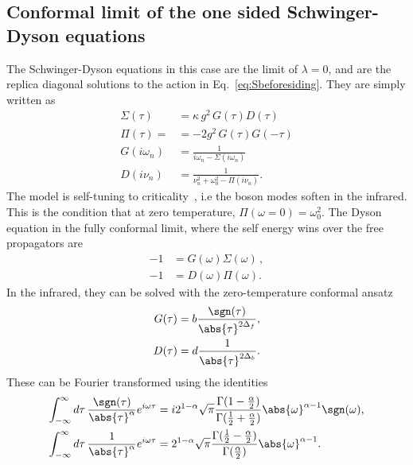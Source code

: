 \subsection{Conformal limit of the one sided Schwinger-Dyson equations}
\label{app:confoneside}
The Schwinger-Dyson equations in this case are the limit of $\lambda = 0$, and are the replica diagonal solutions to the action in Eq.~\eqref{eq:Sbeforesiding}. They are simply written as
\begin{subequations}
\begin{align}
    \Sigma(\tau) &= \kappa \, g^2 \, G(\tau) D(\tau) \\
    \Pi(\tau) = &= -2g^2 \, G(\tau)G(-\tau) \\
    G(i\omega_n) &= \frac{1}{i\omega_n - \Sigma(i\omega_n)} \\
    D(i\nu_n) &= \frac{1}{\nu_n^2 + \omega_0^2 - \Pi(i\nu_n)} .
    \label{eq:SchDysEqnsSingleYSYK_Imag}
\end{align}
\end{subequations}
The model is self-tuning to criticality~\cite{esterlis2019cooper}, i.e the boson modes soften in the infrared. This is the condition that at zero temperature, $\Pi(\omega = 0) = \omega_0^2$.
The Dyson equation in the fully conformal limit, where the self energy wins over the free propagators are 
\begin{subequations}
\begin{align}
     -1 &= G(\omega)\Sigma(\omega) \,, \\
     -1 &= D(\omega)\Pi(\omega).
\end{align}
    \label{eq:DysonFreq}
\end{subequations}
In the infrared, they can be solved with the zero-temperature conformal ansatz 
\begin{align}
    G(\tau) &= b\frac{\sgn(\tau)}{\abs{\tau}^{2\Delta_f}} ,\\
    D(\tau) &= d\frac{1}{\abs{\tau}^{2\Delta_b}} .
\end{align}
These can be Fourier transformed using the identities
\begin{align}
        \int_{-\infty}^{\infty} d\tau\,\frac{\sgn(\tau)}{\abs{\tau}^\alpha} e^{i\omega\tau} &= i2^{1-\alpha}\sqrt{\pi}\frac{\Gamma(1-\frac{\alpha}{2})}{\Gamma(\frac{1}{2}+\frac{\alpha}{2})}\abs{\omega}^{\alpha-1}\sgn(\omega) , \\
        \int_{-\infty}^{\infty} d\tau\,\frac{1}{\abs{\tau}^\alpha} e^{i\omega\tau}  &= 2^{1-\alpha}\sqrt{\pi}\frac{\Gamma(\frac{1}{2}-\frac{\alpha}{2})}{\Gamma(\frac{\alpha}{2})}\abs{\omega}^{\alpha-1}. 
\end{align}
